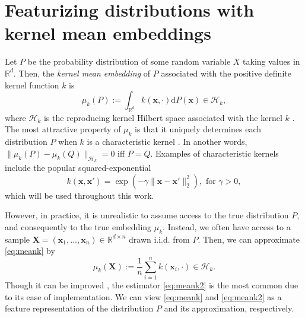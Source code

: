 \documentclass[twoside,11pt,a4paper]{article}
\begin{document}
\section{Featurizing distributions with kernel mean embeddings}
\label{sec:features}
Let $P$ be the probability distribution of some random variable $X$ taking
values in $\mathbb{R}^d$.  Then, the \emph{kernel mean embedding} of $P$
associated with the positive definite kernel function $k$ is 
\begin{equation}
  \label{eq:meank}
  \mu_k(P) := \int_{\mathbb{R}^d} k(\bm x, \cdot) \mathrm{d}P(\bm x) \in
  \mathcal{H}_k,
\end{equation}
where $\mathcal{H}_k$ is the reproducing kernel Hilbert space associated with
the kernel $k$ \citep{Berlinet04:RKHS,Smola07Hilbert}. The most attractive
property of $\mu_k$ is that it uniquely determines each distribution $P$ when
$k$ is a characteristic kernel
\citep{Sriperumbudur10:Metrics}. In another words,
$\|\mu_k(P)-\mu_k(Q)\|_{\mathcal{H}_k}=0$ iff $P=Q$. Examples of characteristic
kernels include the popular squared-exponential
\begin{equation}\label{eq:gauss}
  k(\bm x, \bm x') = \exp\left(-\gamma \|\bm x- \bm x'\|_2^2\right), \text{ for }
  \gamma >0,
\end{equation}
which will be used throughout this work.

However, in practice, it is unrealistic to assume access to the true
distribution $P$, and consequently to the true embedding $\mu_k$. Instead, we
often have access to a sample $\bm X = (\bm x_1, \ldots, \bm x_n) \in
\mathbb{R}^{d \times n}$ drawn i.i.d.  from $P$. Then, we can approximate
\eqref{eq:meank} by 
\begin{equation}
  \label{eq:meank2} 
  \hat{\mu}_k(\bm X) := \frac{1}{n} \sum_{i=1}^n k(\bm x_i, \cdot) \in \mathcal{H}_k.
\end{equation}
Though it can be improved \citep{Muandet14:KMSE}, the estimator
\eqref{eq:meank2} is the most common due to its ease of implementation. We can view
\eqref{eq:meank} and \eqref{eq:meank2} as a feature representation of the
distribution $P$ and its approximation, respectively. 
\end{document}
